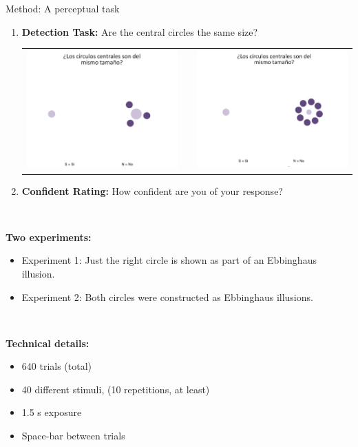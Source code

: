 \documentclass[final]{beamer}
\newlength{\onecolwid}
\begin{document}
\begin{frame}[t]
\begin{columns}[t]
\begin{column}{\onecolwid}
\begin{alertblock}{Method: A perceptual task}
$\quad$
\begin{enumerate}
\item \textbf{Detection Task:} Are the central circles the same size?
\begin{center}
\begin{tabular}{ccc}
\includegraphics[width=0.35\linewidth]{Figures/MainTask.png} & \hfill & \includegraphics[width=0.35\linewidth]{Figures/MainTask2.png}
\end{tabular}
\end{center}
\item \textbf{Confident Rating:} How confident are you of your response?
\end{enumerate}
$\qquad$

\textbf{Two experiments:} 

\begin{itemize}
\item Experiment 1: Just the right circle is shown as part of an Ebbinghaus illusion.
\item Experiment 2: Both circles were constructed as Ebbinghaus illusions.
\end{itemize}

$\qquad$

\textbf{Technical details:} 

\begin{itemize}
\item 640 trials (total)
\item 40 different stimuli, (10 repetitions, at least)
\item 1.5 s exposure
\item Space-bar between trials
\end{itemize}
\end{alertblock}


\end{column}
\end{columns}
\end{frame}
\end{document}

